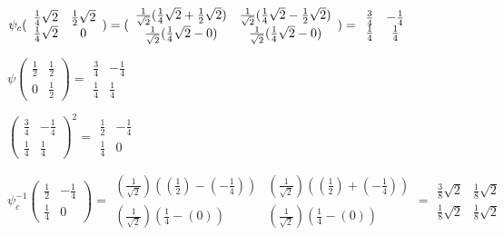 \documentclass{article}
\begin{document}
$\psi _{c}(
\begin{array}{cc}
\frac{1}{4}\sqrt{2} & \frac{1}{2}\sqrt{2} \\ 
\frac{1}{4}\sqrt{2} & 0
\end{array}
)=(
\begin{array}{cc}
\frac{1}{\sqrt{2}}(\frac{1}{4}\sqrt{2}+\frac{1}{2}\sqrt{2}) & \frac{1}{\sqrt{%
2}}(\frac{1}{4}\sqrt{2}-\frac{1}{2}\sqrt{2}) \\ 
\frac{1}{\sqrt{2}}(\frac{1}{4}\sqrt{2}-0) & \frac{1}{\sqrt{2}}(\frac{1}{4}%
\sqrt{2}-0)
\end{array}
)=\allowbreak 
\begin{array}{cc}
\frac{3}{4} & -\frac{1}{4} \\ 
\frac{1}{4} & \frac{1}{4}
\end{array}
$

$\psi ( 
\begin{array}{cc}
\frac{1}{2} & \frac{1}{2} \\ 
0 & \frac{1}{2}
\end{array}
)= 
\begin{array}{cc}
\frac{3}{4} & -\frac{1}{4} \\ 
\frac{1}{4} & \frac{1}{4}
\end{array}
$

$( 
\begin{array}{cc}
\frac{3}{4} & -\frac{1}{4} \\ 
\frac{1}{4} & \frac{1}{4}
\end{array}
)^{2}=\allowbreak 
\begin{array}{cc}
\frac{1}{2} & -\frac{1}{4} \\ 
\frac{1}{4} & 0
\end{array}
$

$\psi _{c}^{-1}(
\begin{array}{cc}
\frac{1}{2} & -\frac{1}{4} \\ 
\frac{1}{4} & 0
\end{array}
)=
\begin{array}{cc}
(\frac{1}{\sqrt{2}})((\frac{1}{2})-(-\frac{1}{4})) & (\frac{1}{\sqrt{2}})((%
\frac{1}{2})+(-\frac{1}{4})) \\ 
(\frac{1}{\sqrt{2}})(\frac{1}{4}-(0)) & (\frac{1}{\sqrt{2}})(\frac{1}{4}-(0))
\end{array}
=\allowbreak 
\begin{array}{cc}
\frac{3}{8}\sqrt{2} & \frac{1}{8}\sqrt{2} \\ 
\frac{1}{8}\sqrt{2} & \frac{1}{8}\sqrt{2}
\end{array}
$
\end{document}
